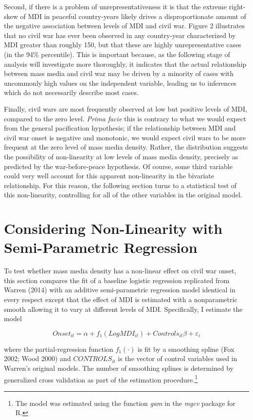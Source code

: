 \documentclass[11pt,article,oneside]{memoir}
\begin{document}
Second, if there is a problem of unrepresentativeness it is that the
extreme right-skew of MDI in peaceful country-years likely drives a
disproportionate amount of the negative association between levels of
MDI and civil war. Figure 2 illustrates that no civil war has ever been
observed in any country-year characterized by MDI greater than roughly
150, but that these are highly unrepresentative cases (in the 94\%
percentile). This is important because, as the following stage of
analysis will investigate more thoroughly, it indicates that the actual
relationship between mass media and civil war may be driven by a
minority of cases with uncommonly high values on the independent
variable, leading us to inferences which do not necessarily describe
most cases.

Finally, civil wars are most frequently observed at low but positive
levels of MDI, compared to the zero level. \emph{Prima facie} this is
contrary to what we would expect from the general pacification
hypothesis; if the relationship between MDI and civil war onset is
negative and monotonic, we would expect civil wars to be more frequent
at the zero level of mass media density. Rather, the distribution
suggests the possibility of non-linearity at low levels of mass media
density, precisely as predicted by the war-before-peace hypothesis. Of
course, some third variable could very well account for this apparent
non-linearity in the bivariate relationship. For this reason, the
following section turns to a statistical test of this non-linearity,
controlling for all of the other variables in the original model.

\section{Considering Non-Linearity with Semi-Parametric
Regression}\label{considering-non-linearity-with-semi-parametric-regression}

To test whether mass media density has a non-linear effect on civil war
onset, this section compares the fit of a baseline logistic regression
replicated from Warren (2014) with an additive semi-parametric
regression model identical in every respect except that the effect of
MDI is estimated with a nonparametric smooth allowing it to vary at
different levels of MDI. Specifically, I estimate the model

\[ Onset_{it} = \alpha + f_1 (LogMDI_{it}) + Controls_{it} \beta  + \varepsilon_i \]

where the partial-regression function $f_1 (\cdot)$ is fit by a
smoothing spline (Fox 2002; Wood 2000) and $CONTROLS_{it}$ is the vector
of control variables used in Warren's original models. The number of
smoothing splines is determined by generalized cross validation as part
of the estimation procedure.\footnote{The model was estimated using the
  function \emph{gam} in the \emph{mgcv} package for R.}
\end{document}
